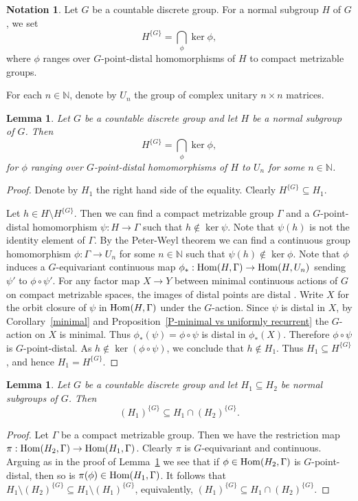 \documentclass[11pt]{amsart}
\newtheorem{lemma}[theorem]{Lemma}
\theoremstyle{definition}
\newtheorem{notation}[theorem]{Notation}
\numberwithin{equation}{section}
\theoremstyle{definition}
\newcommand{\Nb}{{\mathbb N}}
\newcommand{\Hom}{{\rm Hom}}
\begin{document}
\begin{notation} \label{N-point-distal kernel}
Let $G$ be a countable discrete group. For a normal subgroup $H$ of $G$, we set
$$ H^{\{G\}}=\bigcap_\phi \ker \phi,$$
where $\phi$ ranges over $G$-point-distal homomorphisms of $H$ to compact metrizable groups. 
\end{notation}

For each $n\in \Nb$, denote by $U_n$ the group of complex unitary $n\times n$ matrices. 

\begin{lemma} \label{L-point-distal kernel}
Let $G$ be a countable discrete group and let $H$ be a normal subgroup of $G$. Then 
$$ H^{\{G\}}=\bigcap_\phi \ker \phi,$$
for $\phi$ ranging over $G$-point-distal homomorphisms of $H$ to $U_n$ for some $n\in \Nb$. 
\end{lemma}
\begin{proof} Denote by $H_1$ the right hand side of the equality. Clearly $H^{\{G\}}\subseteq H_1$. 

Let $h\in H\setminus H^{\{G\}}$. Then we can find a compact metrizable group $\Gamma$ and a $G$-point-distal homomorphism $\psi: H\rightarrow \Gamma$ such that $h\not\in \ker \psi$. Note that $\psi(h)$ is not the identity element of $\Gamma$. By the Peter-Weyl theorem \cite[Theorem II.3.1]{BT} we can find a continuous group homomorphism $\phi: \Gamma\rightarrow U_n$ for some $n\in \Nb$ such that $\psi(h)\not\in \ker \phi$. Note that $\phi$ induces a $G$-equivariant continuous map $\phi_*: \Hom(H, \Gamma)\rightarrow \Hom(H, U_n)$ sending $\psi'$ to $\phi\circ \psi'$. For any factor map $X\rightarrow Y$ between minimal continuous actions of $G$ on compact metrizable spaces, the images of distal points are distal \cite[Corollary IV.3.25.2]{deVries}. Write $X$ for the orbit closure of $\psi$ in $\Hom(H, \Gamma)$ under the $G$-action. Since $\psi$ is distal in $X$, by Corollary~\ref{minimal} and Proposition~\ref{P-minimal vs uniformly recurrent} the $G$-action on $X$ is minimal. Thus $\phi_*(\psi)=\phi\circ \psi$ is distal in $\phi_*(X)$. Therefore $\phi\circ \psi$ is $G$-point-distal. As $h\not\in \ker(\phi\circ \psi)$, we conclude that $h\not\in H_1$. Thus $H_1\subseteq H^{\{G\}}$, and hence $H_1=H^{\{G\}}$.
\end{proof}

\begin{lemma} \label{L-point-distal restriction}
Let $G$ be a countable discrete group and let $H_1\subseteq H_2$ be normal subgroups of $G$. Then 
$$ (H_1)^{\{G\}}\subseteq H_1\cap (H_2)^{\{G\}}.$$
\end{lemma}
\begin{proof} Let $\Gamma$ be a compact metrizable group. Then we have the restriction map $\pi: \Hom(H_2, \Gamma)\rightarrow \Hom(H_1, \Gamma)$. Clearly $\pi$ is $G$-equivariant and continuous. Arguing as in the proof of Lemma~\ref{L-point-distal kernel} we see that if $\phi\in \Hom(H_2, \Gamma)$ is $G$-point-distal, then so is $\pi(\phi)\in \Hom(H_1, \Gamma)$. It follows that $H_1\setminus (H_2)^{\{G\}}\subseteq H_1\setminus (H_1)^{\{G\}}$, equivalently, $(H_1)^{\{G\}}\subseteq H_1\cap (H_2)^{\{G\}}$.
\end{proof}
\end{document}
